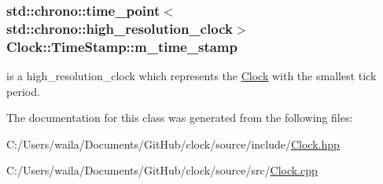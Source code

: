 \subsubsection[{\texorpdfstring{m\+\_\+time\+\_\+stamp}{m_time_stamp}}]{\setlength{\rightskip}{0pt plus 5cm}std\+::chrono\+::time\+\_\+point$<$std\+::chrono\+::high\+\_\+resolution\+\_\+clock$>$ Clock\+::\+Time\+Stamp\+::m\+\_\+time\+\_\+stamp}\hypertarget{class_clock_1_1_time_stamp_a6de590697ea903decd70a91bcc9d4a54}{}\label{class_clock_1_1_time_stamp_a6de590697ea903decd70a91bcc9d4a54}


is a high\+\_\+resolution\+\_\+clock which represents the \hyperlink{class_clock}{Clock} with the smallest tick period. 



The documentation for this class was generated from the following files\+:\begin{DoxyCompactItemize}
\item 
C\+:/\+Users/waila/\+Documents/\+Git\+Hub/clock/source/include/\hyperlink{_clock_8hpp}{Clock.\+hpp}\item 
C\+:/\+Users/waila/\+Documents/\+Git\+Hub/clock/source/src/\hyperlink{_clock_8cpp}{Clock.\+cpp}\end{DoxyCompactItemize}

